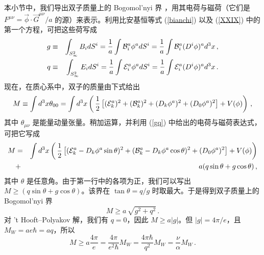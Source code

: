 本小节中，我们导出双子质量上的 Bogomol'nyi 界 \cite{bogomol}，用其电荷与磁荷（它们是 $F^{\mu\nu}=\vec{\phi}\cdot \vec{G}^{\mu\nu}/a$ 的源）来表示。利用比安基恒等式 (\ref{bianchi}) 以及 (\ref{XXIX}) 中的第一个方程，可把这些荷写成
\begin{eqnarray} 
g&\equiv&\int_{S^2_\infty}B_i dS^i=\frac{1}{a}\int{\cal B}^a_i\phi^a
dS^i = \frac{1}{a} \int {\cal B}^a_i (D^i \phi)^a d^3x\,,
\nonumber\\
q&\equiv&\int_{S^2_\infty}E_i dS^i=\frac{1}{a}\int{\cal E}^a_i\phi^a
dS^i = \frac{1}{a} \int {\cal E}^a_i (D^i \phi)^a d^3x\,. 
\label{gq}
\end{eqnarray}
现在，在质心系中，双子的质量由下式给出
$$
M\equiv \int d^3x \theta_{00}= \int d^3x \left(\,\frac{1}{2}
\left[({\cal E}^a_k)^2+({\cal B}^a_k)^2 + (D_k\phi^a)^2 + 
(D_0\phi^a)^2 \right]+ V(\phi) \right)\,,
$$
其中 $\theta_{\mu\nu}$ 是能量动量张量。稍加运算，并利用 (\ref{gq}) 中给出的电荷与磁荷表达式，可把它写成
\begin{eqnarray}
M&=&\int d^3x \left(\,\frac{1}{2}\left[({\cal E}^a_k -
D_k\phi^a\sin\theta)^2 + ({\cal B}^a_k-D_k\phi^a\cos\theta )^2
+(D_0\phi^a)^2\right] + V(\phi) \right)
\nonumber\\
&+& a (q \sin \theta + g \cos \theta )\,,
\label{M-bog}
\end{eqnarray}
其中 $\theta$ 是任意角。由于第一行中的各项为正，我们可以写出 $M\geq (q \sin \theta + g \cos \theta )$。该界在 $\tan\theta = q/g$ 时取最大。于是得到双子质量上的 Bogomol'nyi 界
$$
M \geq a\, \sqrt{g^2 + q^2}\,.
$$
对 't Hooft–Polyakov 解，我们有 $q = 0$，因此 $M \geq a|g|$。但 $|g|=4\pi/e$，且 $M_W=ae\hbar=aq$，所以
$$
M \geq a \frac{4 \pi}{e} = \frac{4 \pi}{e^{2}\hbar} M_{W} =
\frac{4 \pi \hbar}{q^{2}} M_{W} = \frac{\nu}{\alpha} M_{W}\,.
$$
